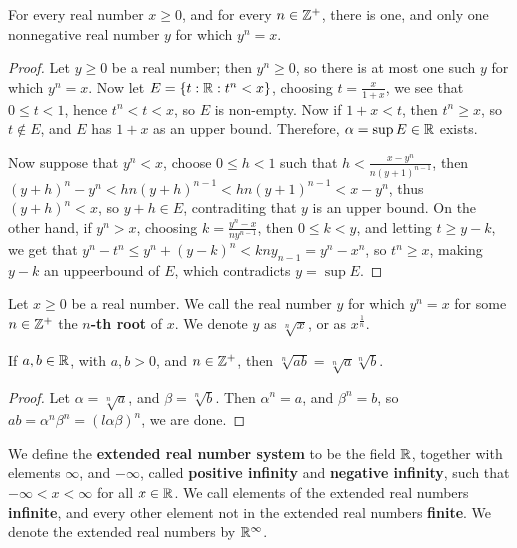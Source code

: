 \begin{theorem}\label{theorem_1.3.4}
  For every real number $x \geq 0$, and for every  $n \in \mathbb{Z}^+$, there is one,
  and only one nonnegative real number  $y$ for which  $y^n=x$.
\end{theorem}
\begin{proof}
  Let $y \geq 0$ be a real number; then $y^n \geq 0$, so there is at most one
  such $y$ for which $y^n=x$. Now let  $E=\{t:\mathbb{R}: t^n<x\}$, choosing
  $t=\frac{x}{1+x}$, we see that $0 \leq t<1$, hence  $t^n<t<x$, so $E$ is
  non-empty. Now if $1+x<t$, then $t^n \geq x$, so $t \not\in E$, and  $E$ has
  $1+x$ as an upper bound. Therefore, $\alpha=\sup{E} \in \mathbb{R}$ exists.

  Now suppose that  $y^n<x$, choose  $0 \leq h<1$ such that
  $h<\frac{x-y^n}{n(y+1)^{n-1}}$, then
  $(y+h)^n-y^n<hn(y+h)^{n-1}<hn(y+1)^{n-1}<x-y^n$, thus  $(y+h)^n<x$, so  $y+h
  \in E$, contraditing that  $y$ is an upper bound. On the other hand, if
  $y^n>x$, choosing $k=\frac{y^n-x}{ny^{n-1}}$, then $0 \leq k<y$, and letting
  $t \geq y-k$, we get that $y^n-t^n \leq y^n+(y-k)^n<kny_{n-1}=y^n-x^n$, so
  $t^n \geq x$, making  $y-k$ an uppeerbound of  $E$, which contradicts
  $y=\sup{E}$.
\end{proof}

\begin{definition}
  Let $x \geq 0$ be a real number. We call the real number $y$ for which $y^n=x$
  for some $n \in \mathbb{Z}^+$ the \textbf{$n$-th root} of $x$. We denote $y$ as
  $\sqrt[n]{x}$, or as  $x^{\frac{1}{n}}$.
\end{definition}

\begin{corollary}
  If $a,b \in \mathbb{R}$, with  $a,b>0$, and  $n \in \mathbb{Z}^+$, then
  $\sqrt[n]{ab}=\sqrt[n]{a}\sqrt[n]{b}$.
\end{corollary}
\begin{proof}
  Let $\alpha=\sqrt[n]{a}$, and  $\beta=\sqrt[n]{b}$. Then  $\alpha^n=a$, and
  $\beta^n=b$, so $ab=\alpha^n\beta^n=(l\alpha\beta)^n$, we are done.
\end{proof}

\begin{definition}
  We define the \textbf{extended real number system} to be the field $\mathbb{R}$,
  together with elements $\infty$, and  $-\infty$, called  \textbf{positive
  infinity} and \textbf{negative infinity}, such that $-\infty<x<\infty$ for
  all $x \in \mathbb{R}$. We call elements of the extended real numbers \textbf{infinite},
  and every other element not in the extended real numbers \textbf{finite}. We
  denote the extended real numbers by $\mathbb{R}^\infty$.
\end{definition}

